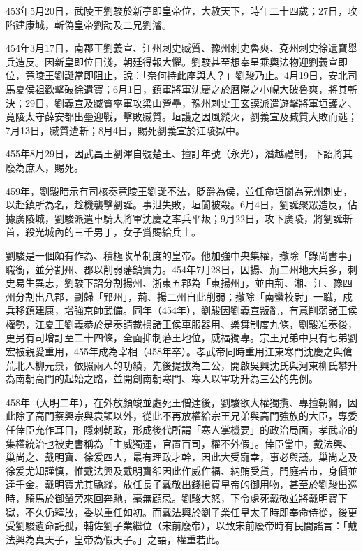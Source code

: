 453年5月20日，武陵王劉駿於新亭即皇帝位，大赦天下，時年二十四歲；27日，攻陷建康城，斬偽皇帝劉劭及二兄劉濬。

454年3月17日，南郡王劉義宣、江州刺史臧質、豫州刺史魯爽、兗州刺史徐遺寶舉兵造反。因新皇即位日淺，朝廷得報大懼。劉駿甚至想奉呈乘輿法物迎劉義宣即位，竟陵王劉誕當即阻止，說：「奈何持此座與人？」劉駿乃止。4月19日，安北司馬夏侯祖歡擊破徐遺寶；6月1日，鎮軍將軍沈慶之於曆陽之小峴大破魯爽，將其斬決；29日，劉義宣及臧質率軍攻梁山營壘，豫州刺史王玄謨派遣遊擊將軍垣護之、竟陵太守薛安都出壘迎戰，擊敗臧質。垣護之因風縱火，劉義宣及臧質大敗而逃；7月13日，臧質遭斬；8月4日，賜死劉義宣於江陵獄中。

455年8月29日，因武昌王劉渾自號楚王、擅訂年號（永光），潛越禮制，下詔將其廢為庶人，賜死。

459年，劉駿暗示有司核奏竟陵王劉誕不法，貶爵為侯，並任命垣閬為兗州刺史，以赴鎮所為名，趁機襲擊劉誕。事泄失敗，垣閬被殺。6月4日，劉誕聚眾造反，佔據廣陵城，劉駿派遣車騎大將軍沈慶之率兵平叛；9月22日，攻下廣陵，將劉誕斬首，殺光城內的三千男丁，女子賞賜給兵士。

劉駿是一個頗有作為、積極改革制度的皇帝。他加強中央集權，撤除「錄尚書事」職銜，並分割州、郡以削弱藩鎮實力。454年7月28日，因揚、荊二州地大兵多，刺史易生異志，劉駿下詔分割揚州、浙東五郡為「東揚州」，並由荊、湘、江、豫四州分割出八郡，劃歸「郢州」，荊、揚二州自此削弱；撤除「南蠻校尉」一職，戍兵移鎮建康，增強京師武備。同年（454年），劉駿因劉義宣叛亂，有意削弱諸王侯權勢，江夏王劉義恭於是奏請裁損諸王侯車服器用、樂舞制度九條，劉駿准奏後，更另有司增訂至二十四條，全面抑制藩王地位，威福獨專。宗王兄弟中只有七弟劉宏被親愛重用，455年成為宰相（458年卒）。孝武帝同時重用江東寒門沈慶之與傖荒北人柳元景，依照兩人的功績，先後提拔為三公，開啟吳興沈氏與河東柳氏攀升為南朝高門的起始之路，並開創南朝寒門、寒人以軍功升為三公的先例。

458年（大明二年），在外放顏竣並處死王僧達後，劉駿欲大權獨攬、專擅朝綱，因此除了高門蔡興宗與袁顗以外，從此不再放權給宗王兄弟與高門強族的大臣，專委任倖臣充作耳目，隱刺朝政，形成後代所謂「寒人掌機要」的政治局面，孝武帝的集權統治也被史書稱為「主威獨運，官置百司，權不外假」。倖臣當中，戴法興、巢尚之、戴明寶、徐爰四人，最有理政才幹，因此大受寵幸，事必與議。巢尚之及徐爰尤知謹慎，惟戴法興及戴明寶卻因此作威作福、納賄受貨，門庭若市，身價並達千金。戴明寶尤其驕縱，放任長子戴敬出錢搶買皇帝的御用物，甚至於劉駿出巡時，騎馬於御輦旁來回奔馳，毫無顧忌。劉駿大怒，下令處死戴敬並將戴明寶下獄，不久仍釋放，委以重任如初。而戴法興於劉子業任皇太子時即奉命侍從，後更受劉駿遺命託孤，輔佐劉子業繼位（宋前廢帝），以致宋前廢帝時有民間謠言：「戴法興為真天子，皇帝為假天子。」之語，權重若此。

